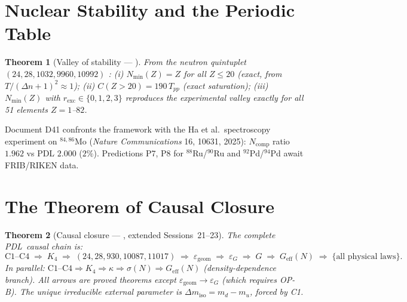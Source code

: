 \documentclass[12pt,a4paper]{article}
\theoremstyle{plain}
\newtheorem{theorem}{Theorem}[section]
\theoremstyle{definition}
\theoremstyle{remark}
\newcommand{\PDL}{\textsc{PDL}}
\newcommand{\Kfour}{K_4}
\newcommand{\kap}{\kappa}
\newcommand{\sigmaN}{\sigma(N)}
\newcommand{\Geff}{G_{\mathrm{eff}}}
\newcommand{\Nmin}{N_{\min}}
\newcommand{\Tpp}{T_{pp}}
\newcommand{\Deltanop}{\Delta n}
\newcommand{\dmiso}{\Delta m_{\mathrm{iso}}}
\newcommand{\egeom}{\varepsilon_{\mathrm{geom}}}
\newcommand{\eG}{\varepsilon_G}
\begin{document}
\section{Nuclear Stability and the Periodic Table}
\label{sec:nuclear}

\begin{theorem}[Valley of stability --- \citep{D40}]
\label{thm:valley}
From the neutron quintuplet $(24,28,1032,9960,10992)$ \citep{D22}: (i) $\Nmin(Z)=Z$ for all $Z\leq 20$ (exact, from $T/(\Deltanop+1)^2\approx 1$); (ii) $C(Z>20)=190\,\Tpp$ (exact saturation); (iii) $\Nmin(Z)$ with $r_{\mathrm{exc}}\in\{0,1,2,3\}$ reproduces the experimental valley \emph{exactly} for all 51 elements $Z=1$--$82$.
\end{theorem}

\noindent Document D41 \citep{D41} confronts the framework with the Ha et al.\ spectroscopy experiment on $^{84,86}$Mo (\textit{Nature Communications} 16, 10631, 2025): $N_{\mathrm{comp}}$ ratio $1.962$ vs PDL $2.000$ ($2\%$). Predictions P7, P8 for $^{88}$Ru/$^{90}$Ru and $^{92}$Pd/$^{94}$Pd await FRIB/RIKEN data.

\section{The Theorem of Causal Closure}
\label{sec:closure}

\begin{theorem}[Causal closure --- \citep{D42}, extended Sessions~21--23]
\label{thm:closure}
The complete \PDL\ causal chain is:
\[
\mathrm{C1\text{--}C4}
\;\Rightarrow\; \Kfour
\;\Rightarrow\; (24,28,930,10087,11017)
\;\Rightarrow\; \egeom
\;\Rightarrow\; \eG
\;\Rightarrow\; G
\;\Rightarrow\; \Geff(N)
\;\Rightarrow\; \{\text{all physical laws}\}.
\]
In parallel: $\mathrm{C1\text{--}C4} \Rightarrow \Kfour \Rightarrow \kap \Rightarrow \sigmaN \Rightarrow \Geff(N)$ (density-dependence branch). All arrows are proved theorems except $\egeom\to\eG$ (which requires OP-B). The unique irreducible external parameter is $\dmiso=m_d-m_u$, forced by C1.
\end{theorem}
\end{document}
